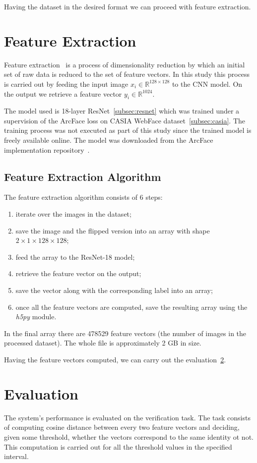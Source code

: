 Having the dataset in the desired format we can proceed with feature extraction.

\section{Feature Extraction}\label{sec:feature-extraction}
Feature extraction~\cite{FeEx} is a process of dimensionality reduction by which an initial set of raw data
is reduced to the set of feature vectors.
In this study this process is carried out by feeding the input image $x_i \in \mathbb{R}^{128\times128 }$ to the CNN model.
On the output we retrieve a feature vector $y_i \in \mathbb{R}^{1024}$.

The model used is 18-layer ResNet~\ref{subsec:resnet} which was trained under a supervision of the ArcFace loss
on CASIA WebFace dataset~\ref{subsec:casia}.
The training process was not executed as part of this study since the trained model is freely available online.
The model was downloaded from the ArcFace implementation repository~\cite{ArcFacePyTorch}.

\subsection{Feature Extraction Algorithm}\label{subsec:feexalgo}
The feature extraction algorithm consists of 6 steps:
\begin{enumerate}
    \item iterate over the images in the dataset;
    \item save the image and the flipped version into an array with shape $2\times1\times128\times128$;
    \item feed the array to the ResNet-18 model;
    \item retrieve the feature vector on the output;
    \item save the vector along with the corresponding label into an array;
    \item once all the feature vectors are computed, save the resulting array using the \textit{h5py} module.
\end{enumerate}

In the final array there are 478529 feature vectors (the number of images in the processed dataset).
The whole file is approximately 2 GB in size.

Having the feature vectors computed, we can carry out the evaluation~\ref{sec:evaluation}.

\section{Evaluation}\label{sec:evaluation}
The system's performance is evaluated on the verification task.
The task consists of computing cosine distance between every two feature
vectors and deciding, given some threshold, whether the vectors correspond to the same identity ot not.
This computation is carried out for all the threshold values in the specified interval.

